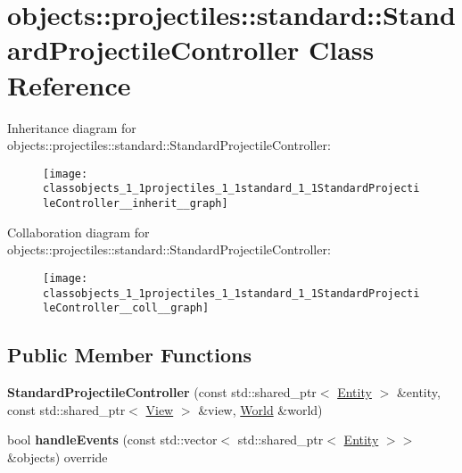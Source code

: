 \hypertarget{classobjects_1_1projectiles_1_1standard_1_1StandardProjectileController}{}\section{objects\+:\+:projectiles\+:\+:standard\+:\+:Standard\+Projectile\+Controller Class Reference}
\label{classobjects_1_1projectiles_1_1standard_1_1StandardProjectileController}


Inheritance diagram for objects\+:\+:projectiles\+:\+:standard\+:\+:Standard\+Projectile\+Controller\+:\nopagebreak
\begin{figure}[H]
\begin{center}
\leavevmode
\texttt{[image: classobjects\_1\_1projectiles\_1\_1standard\_1\_1StandardProjectileController\_\_inherit\_\_graph]}
\end{center}
\end{figure}


Collaboration diagram for objects\+:\+:projectiles\+:\+:standard\+:\+:Standard\+Projectile\+Controller\+:\nopagebreak
\begin{figure}[H]
\begin{center}
\leavevmode
\texttt{[image: classobjects\_1\_1projectiles\_1\_1standard\_1\_1StandardProjectileController\_\_coll\_\_graph]}
\end{center}
\end{figure}
\subsection*{Public Member Functions}
\begin{DoxyCompactItemize}
\item 
\mbox{\label{classobjects_1_1projectiles_1_1standard_1_1StandardProjectileController_a9d31e5fdb4680c3ce373bfb494a5920e}}
{\bfseries Standard\+Projectile\+Controller} (const std\+::shared\+\_\+ptr$<$ \hyperlink{classobjects_1_1Entity}{Entity} $>$ \&entity, const std\+::shared\+\_\+ptr$<$ \hyperlink{classobjects_1_1View}{View} $>$ \&view, \hyperlink{classWorld}{World} \&world)
\item 
\mbox{\label{classobjects_1_1projectiles_1_1standard_1_1StandardProjectileController_ad591fceeeebeb569a4d5a1915cadaa6b}}
bool {\bfseries handle\+Events} (const std\+::vector$<$ std\+::shared\+\_\+ptr$<$ \hyperlink{classobjects_1_1Entity}{Entity} $>$$>$ \&objects) override
\end{DoxyCompactItemize}
